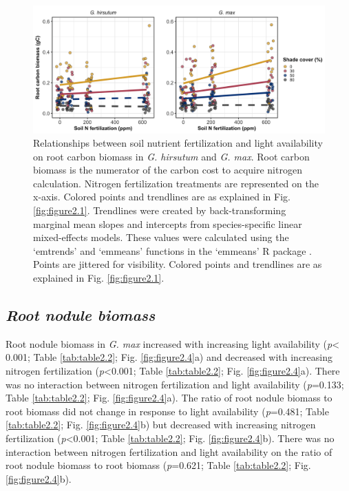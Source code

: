 \newpage
\begin{landscape}
\begin{figure}
    \centering
    \includegraphics[scale = 1]{ch2_LxN_Greenhouse/figs/fig3_rootCarbon.png}
    \caption[Relationships between soil nitrogen fertilization and light availability on root carbon biomass in \textit{G. hirsutum} and \textit{G. max}]{Relationships between soil nutrient fertilization and light availability on root carbon biomass in \textit{G. hirsutum} and \textit{G. max}. Root carbon biomass is the numerator of the carbon cost to acquire nitrogen calculation. Nitrogen fertilization treatments are represented on the x-axis. Colored points and trendlines are as explained in Fig. \ref{fig:figure2.1}. Trendlines were created by back-transforming marginal mean slopes and intercepts from species-specific linear mixed-effects models. These values were calculated using the `emtrends’ and `emmeans’ functions in the `emmeans’ R package . Points are jittered for visibility. Colored points and trendlines are as explained in Fig. \ref{fig:figure2.1}.}
    \label{fig:figure2.3}
\end{figure}
\end{landscape}
\clearpage

\newpage
\subsection{\textit{Root nodule biomass}}
\noindent Root nodule biomass in \textit{G. max} increased with increasing light availability (\textit{p}< 0.001; Table \ref{tab:table2.2}; Fig. \ref{fig:figure2.4}a) and decreased with increasing nitrogen fertilization (\textit{p}<0.001; Table \ref{tab:table2.2}; Fig. \ref{fig:figure2.4}a). There was no interaction between nitrogen fertilization and light availability (\textit{p}=0.133; Table \ref{tab:table2.2}; Fig. \ref{fig:figure2.4}a). The ratio of root nodule biomass to root biomass did not change in response to light availability (\textit{p}=0.481; Table \ref{tab:table2.2}; Fig. \ref{fig:figure2.4}b) but decreased with increasing nitrogen fertilization (\textit{p}<0.001; Table \ref{tab:table2.2}; Fig. \ref{fig:figure2.4}b). There was no interaction between nitrogen fertilization and light availability on the ratio of root nodule biomass to root biomass (\textit{p}=0.621; Table \ref{tab:table2.2}; Fig. \ref{fig:figure2.4}b).

